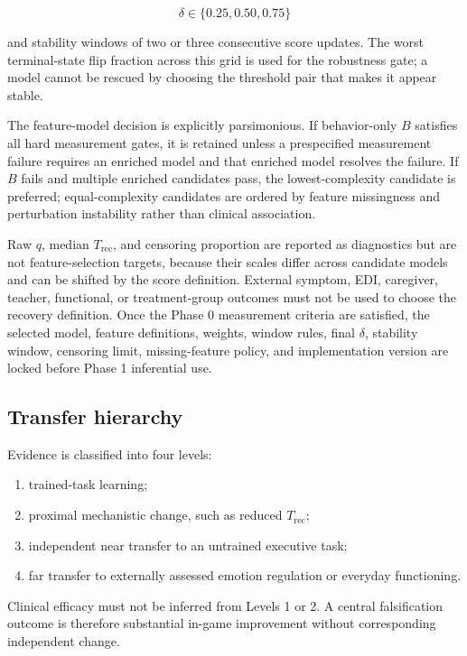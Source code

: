 \[
\delta \in \{0.25,0.50,0.75\}
\]

and stability windows of two or three consecutive score updates. The worst terminal-state flip fraction across this grid is used for the robustness gate; a model cannot be rescued by choosing the threshold pair that makes it appear stable.

The feature-model decision is explicitly parsimonious. If behavior-only \(B\) satisfies all hard measurement gates, it is retained unless a prespecified measurement failure requires an enriched model and that enriched model resolves the failure. If \(B\) fails and multiple enriched candidates pass, the lowest-complexity candidate is preferred; equal-complexity candidates are ordered by feature missingness and perturbation instability rather than clinical association.

Raw \(q\), median \(T_{\mathrm{rec}}\), and censoring proportion are reported as diagnostics but are not feature-selection targets, because their scales differ across candidate models and can be shifted by the score definition. External symptom, EDI, caregiver, teacher, functional, or treatment-group outcomes must not be used to choose the recovery definition. Once the Phase 0 measurement criteria are satisfied, the selected model, feature definitions, weights, window rules, final \(\delta\), stability window, censoring limit, missing-feature policy, and implementation version are locked before Phase 1 inferential use.

\subsection{Transfer hierarchy}

Evidence is classified into four levels:

\begin{enumerate}
\item trained-task learning;
\item proximal mechanistic change, such as reduced \(T_{\mathrm{rec}}\);
\item independent near transfer to an untrained executive task;
\item far transfer to externally assessed emotion regulation or everyday functioning.
\end{enumerate}

Clinical efficacy must not be inferred from Levels 1 or 2. A central falsification outcome is therefore substantial in-game improvement without corresponding independent change.

